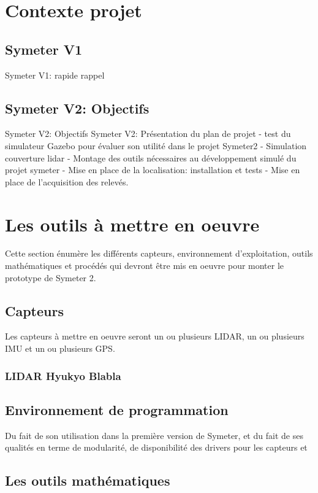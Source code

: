\documentclass[12pt,a4paper]{report}
\begin{document}
	\section{Contexte projet}
		\subsection{Symeter V1}
		Symeter V1: rapide rappel
		
		\subsection{Symeter V2: Objectifs}
		Symeter V2: Objectifs
		Symeter V2: Présentation du plan de projet
- test du simulateur Gazebo pour évaluer son utilité dans le projet Symeter2
- Simulation couverture lidar
- Montage des outils nécessaires au développement simulé du projet symeter
- Mise en place de la localisation: installation et tests
- Mise en place de l'acquisition des relevés.

	\section{Les outils à mettre en oeuvre}
	Cette section énumère les différents capteurs, environnement d'exploitation, outils mathématiques et procédés qui devront être mis en oeuvre pour monter le prototype de Symeter 2.
	
		\subsection{Capteurs}
			Les capteurs à mettre en oeuvre seront un ou plusieurs LIDAR, un ou plusieurs IMU et un ou plusieurs GPS.
		\subsubsection{LIDAR Hyukyo Blabla}
		\subsection{Environnement de programmation}
		Du fait de son utilisation dans la première version de Symeter, et du fait de ses qualités en terme de modularité, de disponibilité des drivers pour les capteurs et 
		\subsection{Les outils mathématiques}
\end{document}
